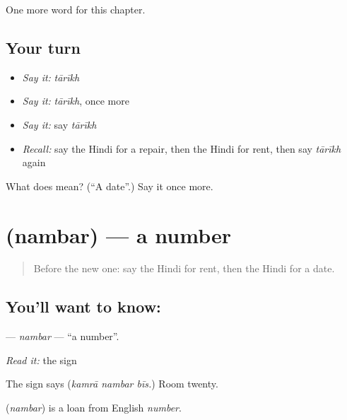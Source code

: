 \begin{grammarlens}[title={What you've built}]
One more word for this chapter.
\end{grammarlens}

\subsection*{Your turn}
\begin{itemize}
\raggedright
  \item \emph{Say it:} \emph{tārīkh}
  \item \emph{Say it:} \emph{tārīkh}, once more
  \item \emph{Say it:} say \emph{tārīkh}
  \item \emph{Recall:} say the Hindi for a repair, then the Hindi for rent, then say \emph{tārīkh} again
\end{itemize}

\begin{tcolorbox}[breakable,colback=teal!4,colframe=teal!35!black,title={Before you move on}]
What does  mean? (\textquotedblleft{}A date\textquotedblright{}.) Say it once more.
\end{tcolorbox}
\section[\texorpdfstring{\hi{नंबर} (nambar)}{नंबर (nambar)}]{ (nambar) — a number}

\label{lesson:HI-C167-nambar}



\begin{quote}
Before the new one: say the Hindi for rent, then the Hindi for a date.
\end{quote}

\subsection*{You'll want to know: }
\textbf{} — \emph{nambar} — \textquotedblleft{}a number\textquotedblright{}.

\emph{Read it:} the sign

The sign says \textbf{  } (\emph{kamrā nambar bīs.}) Room twenty.

\begin{cousinweb}
\textbf{} (\emph{nambar}) is a loan from English \emph{number}.
\end{cousinweb}

